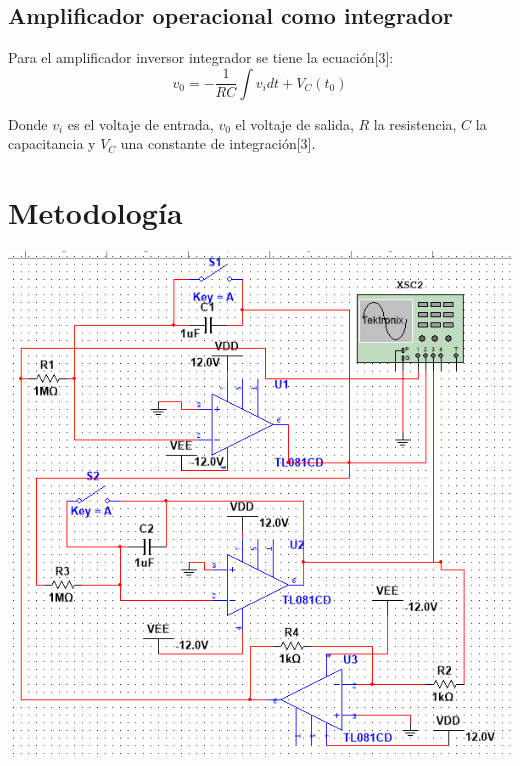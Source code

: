 \documentclass[DIV=calc, paper=a4, fontsize=11pt]{scrartcl}
\newenvironment{Figura}
  {\par\medskip\noindent\minipage{\linewidth}}
  {\endminipage\par\medskip}
\begin{document}
\begin{multicols}{2}
\subsection*{Amplificador operacional como integrador}


Para el amplificador inversor integrador se tiene la ecuación[3]:
\begin{equation}
    v_0 =- \frac{1}{RC} \int v_i dt + V_C(t_0)
\end{equation}

Donde $v_{i}$ es el voltaje de entrada, $v_{0}$ el voltaje de salida, $R$ la resistencia, $C$ la capacitancia y $V_C$ una constante de integración[3].




\section*{Metodología}

\begin{Figura}
    \centering
    \includegraphics[width=1\textwidth]{Metodologia/Simulacion.png}
    \label{fig}
\end{Figura}


\end{multicols}
\end{document}
